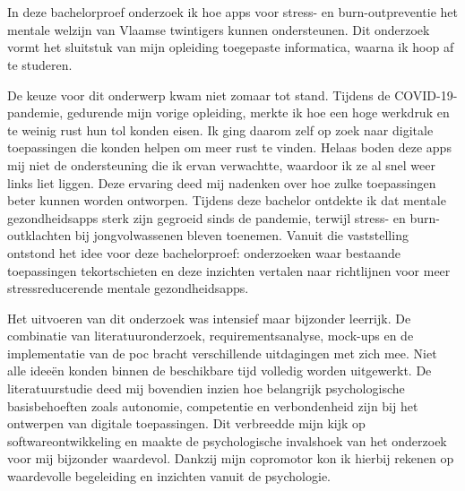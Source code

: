 
\chapter*{}%
\label{ch:voorwoord}


In deze bachelorproef onderzoek ik hoe apps voor stress- en burn-outpreventie het mentale welzijn van Vlaamse twintigers kunnen ondersteunen. Dit onderzoek vormt het sluitstuk van mijn opleiding toegepaste informatica, waarna ik hoop af te studeren.

\vspace{1em}

De keuze voor dit onderwerp kwam niet zomaar tot stand. Tijdens de COVID-19-pandemie, gedurende mijn vorige opleiding, merkte ik hoe een hoge werkdruk en te weinig rust hun tol konden eisen. Ik ging daarom zelf op zoek naar digitale toepassingen die konden helpen om meer rust te vinden. Helaas boden deze apps mij niet de ondersteuning die ik ervan verwachtte, waardoor ik ze al snel weer links liet liggen. Deze ervaring deed mij nadenken over hoe zulke toepassingen beter kunnen worden ontworpen. Tijdens deze bachelor ontdekte ik dat mentale gezondheidsapps sterk zijn gegroeid sinds de pandemie, terwijl stress- en burn-outklachten bij jongvolwassenen bleven toenemen. Vanuit die vaststelling ontstond het idee voor deze bachelorproef: onderzoeken waar bestaande toepassingen tekortschieten en deze inzichten vertalen naar richtlijnen voor meer stressreducerende mentale gezondheidsapps.

\vspace{1em}

Het uitvoeren van dit onderzoek was intensief maar bijzonder leerrijk. De combinatie van literatuuronderzoek, requirementsanalyse, mock-ups en de implementatie van de \acrshort{poc} bracht verschillende uitdagingen met zich mee. Niet alle ideeën konden binnen de beschikbare tijd volledig worden uitgewerkt. De literatuurstudie deed mij bovendien inzien hoe belangrijk psychologische basisbehoeften zoals autonomie, competentie en verbondenheid zijn bij het ontwerpen van digitale toepassingen. Dit verbreedde mijn kijk op softwareontwikkeling en maakte de psychologische invalshoek van het onderzoek voor mij bijzonder waardevol. Dankzij mijn copromotor kon ik hierbij rekenen op waardevolle begeleiding en inzichten vanuit de psychologie.


